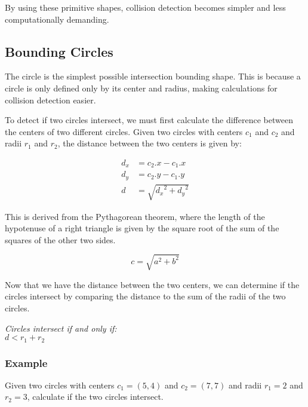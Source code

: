 \documentclass{article}
\begin{document}
By using these primitive shapes, collision detection becomes simpler and less
computationally demanding.

\subsection{Bounding Circles}
The circle is the simplest possible intersection bounding shape. This is
because a circle is only defined only by its center and radius, making
calculations for collision detection easier.

To detect if two circles intersect, we must first calculate the difference
between the centers of two different circles. Given two circles with centers
$c_1$ and $c_2$ and radii $r_1$ and $r_2$, the distance between the two centers
is given by:

\begin{equation}
    \begin{aligned}
        d_x & = c_2.x - c_1.x            \\
        d_y & = c_2.y - c_1.y            \\
        d   & = \sqrt{{d_x}^2 + {d_y}^2}
    \end{aligned}
\end{equation}

This is derived from the Pythagorean theorem, where the length of the
hypotenuse of a right triangle is given by the square root of the sum of the
squares of the other two sides.

\begin{equation}
    c = \sqrt{a^2 + b^2}
\end{equation}

Now that we have the distance between the two centers, we can determine if the
circles intersect by comparing the distance to the sum of the radii of the two
circles.

\begin{center}
    \textit{Circles intersect if and only if:}\\
    $d < r_1 + r_2$
\end{center}

\subsubsection{Example}

Given two circles with centers $c_1 = (5, 4)$ and $c_2 = (7, 7)$ and radii $r_1
    = 2$ and $r_2 = 3$, calculate if the two circles intersect.
\end{document}
